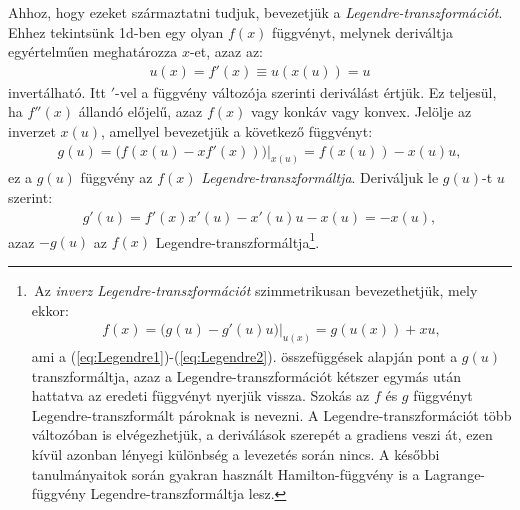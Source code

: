 Ahhoz, hogy ezeket származtatni tudjuk, bevezetjük a \emph{Legendre-transzformációt}. 
Ehhez tekintsünk 1d-ben egy olyan $f(x)$ függvényt, melynek deriváltja egyértelműen meghatározza $x$-et, azaz az:
\begin{align}\label{eq:Legendre1}
	u(x) = f'(x) \equiv u(x(u)) = u
\end{align}
invertálható. Itt $'$-vel a függvény változója szerinti deriválást értjük. Ez teljesül, ha $f''(x)$ állandó előjelű, azaz $f(x)$ vagy konkáv vagy konvex. Jelölje az inverzet $x(u)$, amellyel bevezetjük a következő függvényt:
\begin{align}\label{eq:Legendre2}
	g(u) = \big(f(x(u)-xf'(x)) \big)\Big|_{x(u)} = f(x(u))-x(u) u ,
\end{align}
ez a $g(u)$ függvény az $f(x)$ \emph{Legendre-transzformáltja}. Deriváljuk le $g(u)$-t $u$ szerint:
\begin{align}
	g'(u) = f'(x)x'(u)-x'(u)u - x(u) = -x(u),
\end{align}
azaz $-g(u)$ az $f(x)$ Legendre-transzformáltja\footnote{\,Az \emph{inverz Legendre-transzformációt} szimmetrikusan bevezethetjük, mely ekkor:
\begin{align}
	f(x) = \big(g(u)-g'(u)u \big)\Big|_{u(x)} =  g(u(x)) + xu,
\end{align}
ami a (\ref{eq:Legendre1})-(\ref{eq:Legendre2}). összefüggések alapján pont a $g(u)$ transzformáltja, azaz a Legendre-transzformációt kétszer egymás után hattatva az eredeti függvényt nyerjük vissza. Szokás az $f$ és $g$ függvényt Legendre-transzformált pároknak is nevezni. A Legendre-transzformációt több változóban is elvégezhetjük, a deriválások szerepét a gradiens veszi át, ezen kívül azonban lényegi különbség a levezetés során nincs. A későbbi tanulmányaitok során gyakran használt Hamilton\footnotemark-függvény is a Lagrange\footnotemark-függvény Legendre-transzformáltja lesz.}.
\addtocounter{footnote}{-1}

